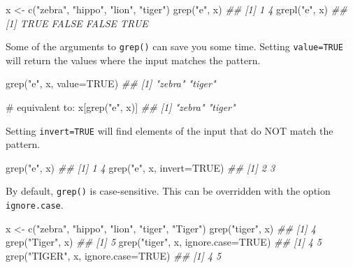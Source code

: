 \documentclass[
  13,
  letterpaper,
]{report}
\newenvironment{Shaded}{\begin{snugshade}}{\end{snugshade}}
\newcommand{\AttributeTok}[1]{\textcolor[rgb]{0.40,0.45,0.13}{#1}}
\newcommand{\CommentTok}[1]{\textcolor[rgb]{0.37,0.37,0.37}{#1}}
\newcommand{\ConstantTok}[1]{\textcolor[rgb]{0.56,0.35,0.01}{#1}}
\newcommand{\DocumentationTok}[1]{\textcolor[rgb]{0.37,0.37,0.37}{\textit{#1}}}
\newcommand{\FunctionTok}[1]{\textcolor[rgb]{0.28,0.35,0.67}{#1}}
\newcommand{\NormalTok}[1]{\textcolor[rgb]{0.00,0.23,0.31}{#1}}
\newcommand{\OtherTok}[1]{\textcolor[rgb]{0.00,0.23,0.31}{#1}}
\newcommand{\StringTok}[1]{\textcolor[rgb]{0.13,0.47,0.30}{#1}}
\begin{document}
\begin{Shaded}
\begin{Highlighting}[]

\NormalTok{x }\OtherTok{\textless{}{-}} \FunctionTok{c}\NormalTok{(}\StringTok{"zebra"}\NormalTok{, }\StringTok{"hippo"}\NormalTok{, }\StringTok{"lion"}\NormalTok{, }\StringTok{"tiger"}\NormalTok{)}
\FunctionTok{grep}\NormalTok{(}\StringTok{"e"}\NormalTok{, x)}
\DocumentationTok{\#\# [1] 1 4}
\FunctionTok{grepl}\NormalTok{(}\StringTok{"e"}\NormalTok{, x)}
\DocumentationTok{\#\# [1]  TRUE FALSE FALSE  TRUE}
\end{Highlighting}
\end{Shaded}

Some of the arguments to \texttt{grep()} can save you some time. Setting
\texttt{value=TRUE} will return the values where the input matches the
pattern.

\begin{Shaded}
\begin{Highlighting}[]
\FunctionTok{grep}\NormalTok{(}\StringTok{"e"}\NormalTok{, x, }\AttributeTok{value=}\ConstantTok{TRUE}\NormalTok{)}
\DocumentationTok{\#\# [1] "zebra" "tiger"}

\CommentTok{\# equivalent to:}
\NormalTok{x[}\FunctionTok{grep}\NormalTok{(}\StringTok{"e"}\NormalTok{, x)]}
\DocumentationTok{\#\# [1] "zebra" "tiger"}
\end{Highlighting}
\end{Shaded}

Setting \texttt{invert=TRUE} will find elements of the input that do NOT
match the pattern.

\begin{Shaded}
\begin{Highlighting}[]
\FunctionTok{grep}\NormalTok{(}\StringTok{"e"}\NormalTok{, x)}
\DocumentationTok{\#\# [1] 1 4}
\FunctionTok{grep}\NormalTok{(}\StringTok{"e"}\NormalTok{, x, }\AttributeTok{invert=}\ConstantTok{TRUE}\NormalTok{)}
\DocumentationTok{\#\# [1] 2 3}
\end{Highlighting}
\end{Shaded}

By default, \texttt{grep()} is case-sensitive. This can be overridden
with the option \texttt{ignore.case}.

\begin{Shaded}
\begin{Highlighting}[]
\NormalTok{x }\OtherTok{\textless{}{-}} \FunctionTok{c}\NormalTok{(}\StringTok{"zebra"}\NormalTok{, }\StringTok{"hippo"}\NormalTok{, }\StringTok{"lion"}\NormalTok{, }\StringTok{"tiger"}\NormalTok{, }\StringTok{"Tiger"}\NormalTok{)}
\FunctionTok{grep}\NormalTok{(}\StringTok{"tiger"}\NormalTok{, x)}
\DocumentationTok{\#\# [1] 4}
\FunctionTok{grep}\NormalTok{(}\StringTok{"Tiger"}\NormalTok{, x)}
\DocumentationTok{\#\# [1] 5}
\FunctionTok{grep}\NormalTok{(}\StringTok{"tiger"}\NormalTok{, x, }\AttributeTok{ignore.case=}\ConstantTok{TRUE}\NormalTok{)}
\DocumentationTok{\#\# [1] 4 5}
\FunctionTok{grep}\NormalTok{(}\StringTok{"TIGER"}\NormalTok{, x, }\AttributeTok{ignore.case=}\ConstantTok{TRUE}\NormalTok{)}
\DocumentationTok{\#\# [1] 4 5}
\end{Highlighting}
\end{Shaded}
\end{document}
